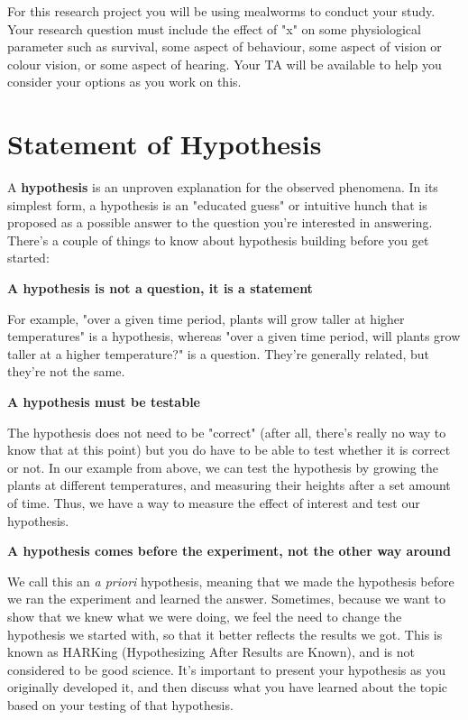 \documentclass[
]{book}
\begin{document}
For this research project you will be using mealworms to conduct your study. Your research question must include the effect of "x" on some physiological parameter such as survival, some aspect of behaviour, some aspect of vision or colour vision, or some aspect of hearing. Your TA will be available to help you consider your options as you work on this.

\hypertarget{statement-of-hypothesis}{%
\chapter*{Statement of Hypothesis}\label{statement-of-hypothesis}}

A \textbf{hypothesis} is an unproven explanation for the observed phenomena. In its simplest form, a hypothesis is an "educated guess" or intuitive hunch that is proposed as a possible answer to the question you're interested in answering. There's a couple of things to know about hypothesis building before you get started:

\textbf{A hypothesis is not a question, it is a statement}

For example, "over a given time period, plants will grow taller at higher temperatures" is a hypothesis, whereas "over a given time period, will plants grow taller at a higher temperature?" is a question. They're generally related, but they're not the same.

\textbf{A hypothesis must be testable}

The hypothesis does not need to be "correct" (after all, there's really no way to know that at this point) but you do have to be able to test whether it is correct or not. In our example from above, we can test the hypothesis by growing the plants at different temperatures, and measuring their heights after a set amount of time. Thus, we have a way to measure the effect of interest and test our hypothesis.

\textbf{A hypothesis comes before the experiment, not the other way around}

We call this an \emph{a priori} hypothesis, meaning that we made the hypothesis before we ran the experiment and learned the answer. Sometimes, because we want to show that we knew what we were doing, we feel the need to change the hypothesis we started with, so that it better reflects the results we got. This is known as HARKing (Hypothesizing After Results are Known), and is not considered to be good science. It's important to present your hypothesis as you originally developed it, and then discuss what you have learned about the topic based on your testing of that hypothesis.
\end{document}

